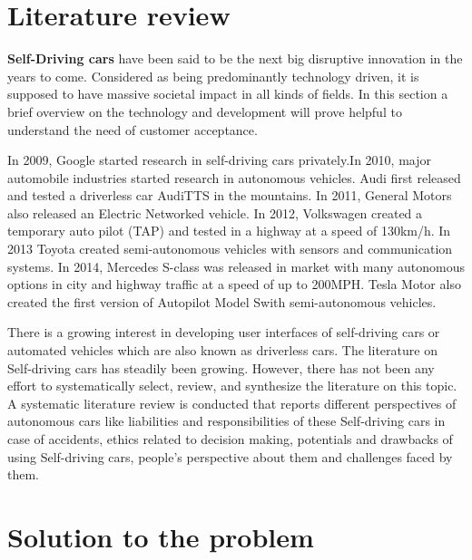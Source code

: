 \documentclass[11pt]{article}
\begin{document}
\section{Literature review}
\label{sec:orgd5a5e2f}
\textbf{Self-Driving cars} have been said to be the next big disruptive innovation in the years to come.
Considered as being predominantly technology driven, it is supposed to have massive societal
impact in all kinds of fields. In this section a brief overview on the technology and development
will prove helpful to understand the need of customer acceptance.

In 2009, Google started research in self-driving cars privately.In 2010, major automobile
industries started research in autonomous vehicles. Audi first released and tested a driverless
car AudiTTS in the mountains. In 2011, General Motors also released an Electric Networked vehicle.
In 2012, Volkswagen created a temporary auto pilot (TAP) and tested in a highway at a speed of 130km/h.
In 2013 Toyota created semi-autonomous vehicles with sensors and communication systems.
In 2014, Mercedes S-class was released in market with many autonomous options in city and
highway traffic at a speed of up to 200MPH. Tesla Motor also created the first version of
Autopilot Model Swith semi-autonomous vehicles.

There is a growing interest in developing user interfaces of self-driving cars or automated
vehicles which are also known as driverless cars. The literature on Self-driving cars has
steadily been growing. However, there has not been any effort to systematically select,
review, and synthesize the literature on this topic. A systematic literature review is
conducted that reports different perspectives of autonomous cars like liabilities and
responsibilities of these Self-driving cars in case of accidents, ethics related to decision
making, potentials and drawbacks of using Self-driving cars, people's perspective about them
and challenges faced by them.
\clearpage

\section{Solution to the problem}
\label{sec:org83eb81b}
\end{document}

